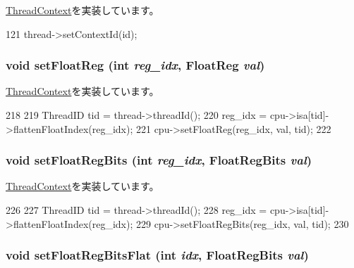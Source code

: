 \hyperlink{classThreadContext_a60a9383e4a460807756f2de9f5215582}{ThreadContext}を実装しています。


\begin{DoxyCode}
121 { thread->setContextId(id); }
\end{DoxyCode}
\hypertarget{classInOrderThreadContext_ab6fd8e55b81c173f448ec0c42bc28b99}{
\subsubsection[{setFloatReg}]{\setlength{\rightskip}{0pt plus 5cm}void setFloatReg (int {\em reg\_\-idx}, \/  {\bf FloatReg} {\em val})}}
\label{classInOrderThreadContext_ab6fd8e55b81c173f448ec0c42bc28b99}


\hyperlink{classThreadContext_af8dc9762fda519d911372dd6f4a28d8e}{ThreadContext}を実装しています。


\begin{DoxyCode}
218 {
219     ThreadID tid = thread->threadId();
220     reg_idx = cpu->isa[tid]->flattenFloatIndex(reg_idx);
221     cpu->setFloatReg(reg_idx, val, tid);
222 }
\end{DoxyCode}
\hypertarget{classInOrderThreadContext_a618651078f08ecd328dfe3312f0f2ea7}{
\subsubsection[{setFloatRegBits}]{\setlength{\rightskip}{0pt plus 5cm}void setFloatRegBits (int {\em reg\_\-idx}, \/  {\bf FloatRegBits} {\em val})}}
\label{classInOrderThreadContext_a618651078f08ecd328dfe3312f0f2ea7}


\hyperlink{classThreadContext_a8f0c8b07cd1c4a6019a5b3922689d1db}{ThreadContext}を実装しています。


\begin{DoxyCode}
226 {
227     ThreadID tid = thread->threadId();
228     reg_idx = cpu->isa[tid]->flattenFloatIndex(reg_idx);
229     cpu->setFloatRegBits(reg_idx, val, tid);
230 }
\end{DoxyCode}
\hypertarget{classInOrderThreadContext_acd974292ff0461c2e94c0b5a1126b503}{
\subsubsection[{setFloatRegBitsFlat}]{\setlength{\rightskip}{0pt plus 5cm}void setFloatRegBitsFlat (int {\em idx}, \/  {\bf FloatRegBits} {\em val})}}
\label{classInOrderThreadContext_acd974292ff0461c2e94c0b5a1126b503}


